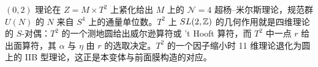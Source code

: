 \begin{yizhu}[易错点]$(0,2)$ 理论在 $Z=M\times T^2$ 上紧化给出 $M$ 上的 ${\mathcal N}=4$ 超杨–米尔斯理论，规范群 $U(N)$ 的 $N$ 来自 $S^4$ 上的通量单位数。$T^2$ 上 $SL(2,{\mathbb{Z}})$ 的几何作用就是四维理论的 $S$-对偶：$T^2$ 的一个测地圆给出威尔逊算符或 't Hooft 算符，而 $T^2$ 中一点 $r$ 给出面算符，其 $\alpha$ 与 $\eta$ 由 $r$ 的选取决定。$T^2$ 的一个因子缩小时 11 维理论退化为圆上的 IIB 型理论，这正是本变体与前面膜构造的对应。\end{yizhu}

